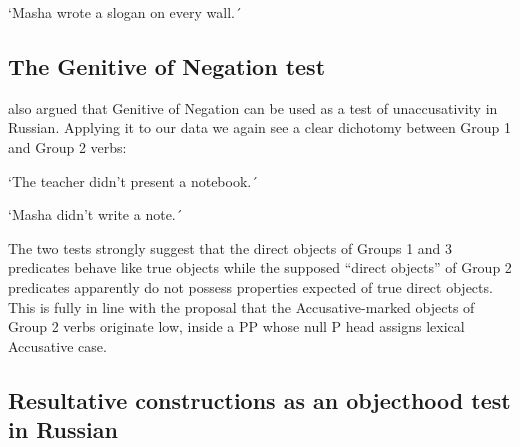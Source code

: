 \documentclass[output=paper,colorlinks,citecolor=brown,modfonts,nonflat]{langsci/langscibook}
\begin{document}
    \glt    `Masha wrote a slogan on every wall.´
    \z

\subsection{The Genitive of Negation test}\label{sec:antonyuk:3.2}

\citet{Pesetsky1982} also argued that Genitive of Negation can be used as a test of unaccusativity in Russian. Applying it to our data we again see a clear dichotomy between Group 1 and Group 2 verbs:

    \glt    `The teacher didn’t present a notebook.´
    \z

    \z

    \glt    `Masha didn’t write a note.´
    \z

The two tests strongly suggest that the direct objects of Groups 1 and 3 predicates behave like true objects while the supposed “direct objects” of Group 2 predicates apparently do not possess properties expected of true direct objects. This is fully in line with the proposal that the Accusative-marked objects of Group 2 verbs originate low, inside a PP whose null P head assigns lexical Accusative case.

\subsection{Resultative constructions as an objecthood test in Russian}\label{sec:antonyuk:3.3}
\end{document}
